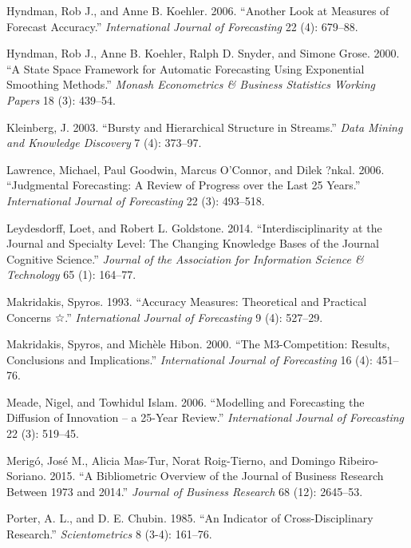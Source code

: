 \documentclass[11pt,a4paper]{elsarticle} %
\begin{document}
\hypertarget{ref-Hyndman2006Another}{}
Hyndman, Rob J., and Anne B. Koehler. 2006. ``Another Look at Measures
of Forecast Accuracy.'' \emph{International Journal of Forecasting} 22
(4): 679--88.

\hypertarget{ref-Hyndman2000}{}
Hyndman, Rob J., Anne B. Koehler, Ralph D. Snyder, and Simone Grose.
2000. ``A State Space Framework for Automatic Forecasting Using
Exponential Smoothing Methods.'' \emph{Monash Econometrics \& Business
Statistics Working Papers} 18 (3): 439--54.

\hypertarget{ref-Kleinberg2003}{}
Kleinberg, J. 2003. ``Bursty and Hierarchical Structure in Streams.''
\emph{Data Mining and Knowledge Discovery} 7 (4): 373--97.

\hypertarget{ref-Lawrence2006Judgmental}{}
Lawrence, Michael, Paul Goodwin, Marcus O'Connor, and Dilek ?nkal. 2006.
``Judgmental Forecasting: A Review of Progress over the Last 25 Years.''
\emph{International Journal of Forecasting} 22 (3): 493--518.

\hypertarget{ref-Leydesdorff2014Interdisciplinarity}{}
Leydesdorff, Loet, and Robert L. Goldstone. 2014. ``Interdisciplinarity
at the Journal and Specialty Level: The Changing Knowledge Bases of the
Journal Cognitive Science.'' \emph{Journal of the Association for
Information Science \& Technology} 65 (1): 164--77.

\hypertarget{ref-Makridakis1993Accuracy}{}
Makridakis, Spyros. 1993. ``Accuracy Measures: Theoretical and Practical
Concerns ☆.'' \emph{International Journal of Forecasting} 9 (4):
527--29.

\hypertarget{ref-Makridakis2000The}{}
Makridakis, Spyros, and Michèle Hibon. 2000. ``The M3-Competition:
Results, Conclusions and Implications.'' \emph{International Journal of
Forecasting} 16 (4): 451--76.

\hypertarget{ref-Meade2006Modelling}{}
Meade, Nigel, and Towhidul Islam. 2006. ``Modelling and Forecasting the
Diffusion of Innovation -- a 25-Year Review.'' \emph{International
Journal of Forecasting} 22 (3): 519--45.

\hypertarget{ref-Meriguxf32015A}{}
Merigó, José M., Alicia Mas-Tur, Norat Roig-Tierno, and Domingo
Ribeiro-Soriano. 2015. ``A Bibliometric Overview of the Journal of
Business Research Between 1973 and 2014.'' \emph{Journal of Business
Research} 68 (12): 2645--53.

\hypertarget{ref-Porter1985An}{}
Porter, A. L., and D. E. Chubin. 1985. ``An Indicator of
Cross-Disciplinary Research.'' \emph{Scientometrics} 8 (3-4): 161--76.
\end{document}
